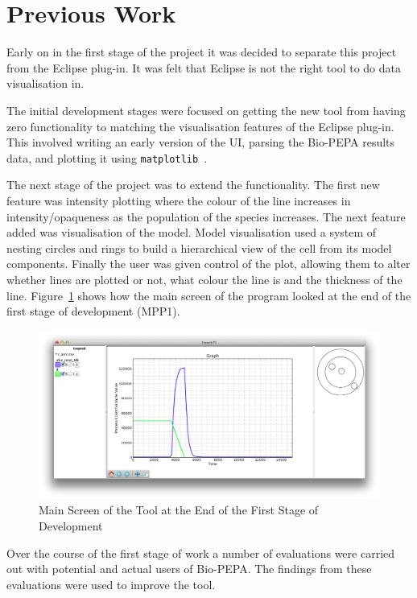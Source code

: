 \section{Previous Work}

Early on in the first stage of the project it was decided to separate this project from the Eclipse plug-in.  It was felt that Eclipse is not the right tool to do data visualisation in.

The initial development stages were focused on getting the new tool from having zero functionality to matching the visualisation features of the Eclipse plug-in.  This involved writing an early version of the \ac{UI}, parsing the Bio-PEPA results data, and plotting it using \texttt{matplotlib}~\cite{mpl}.

The next stage of the project was to extend the functionality.  The first new feature was intensity plotting where the colour of the line increases in intensity/opaqueness as the population of the species increases.  The next feature added was visualisation of the model.  Model visualisation used a system of nesting circles and rings to build a hierarchical view of the cell from its model components.  Finally the user was given control of the plot, allowing them to alter whether lines are plotted or not, what colour the line is and the thickness of the line.  Figure~\ref{fig:f75_mac_intro} shows how the main screen of the program looked at the end of the first stage of development (MPP1).

\begin{figure}[h!]
    \centering
    \includegraphics[width=\textwidth]{images/french75_mac.png}
    \caption{Main Screen of the Tool at the End of the First Stage of Development}
    \label{fig:f75_mac_intro}
\end{figure}

Over the course of the first stage of work a number of evaluations were carried out with potential and actual users of Bio-PEPA.  The findings from these evaluations were used to improve the tool.

